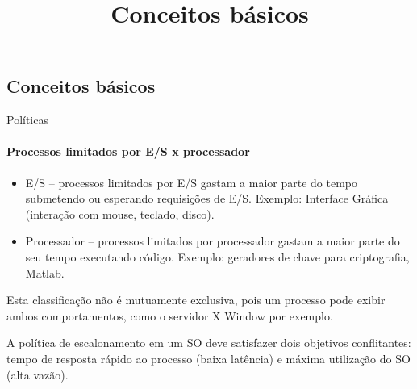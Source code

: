 
\title{\insertlecture}

\frame{\maketitle}

\section{\insertlecture}

\def\thetitle{Conceitos básicos}
\title{\thetitle}
\frame{\date{}\author{}\titlepage}

\subsection{\thetitle}

\begin{frame}{Políticas}
  \framesubtitle{Processos limitados por E/S x processador}
\small
  \begin{itemize}
  \item E/S -- processos limitados por E/S gastam a maior parte do
    tempo submetendo ou esperando requisições de E/S. Exemplo:
    Interface Gráfica (interação com mouse, teclado, disco).
  \item Processador -- processos limitados por processador gastam a
    maior parte do seu tempo executando código. Exemplo: geradores de
    chave para criptografia, {\sc Matlab}.
  \end{itemize}
  Esta classificação não é mutuamente exclusiva, pois um processo pode
  exibir ambos comportamentos, como o servidor {\sc X Window} por exemplo.
\bigskip

  \alert{A política de escalonamento em um SO deve satisfazer dois objetivos
  conflitantes: tempo de resposta rápido ao processo (baixa latência)
  e máxima utilização do SO (alta vazão).}

\end{frame}

